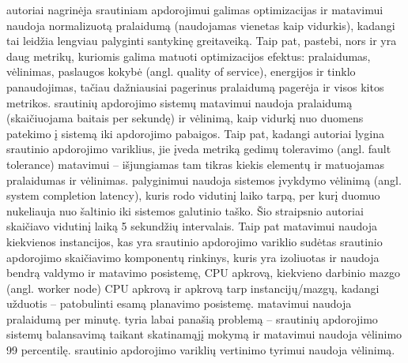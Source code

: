 \documentclass{VUMIFPSbakalaurinis}
\begin{document}
\cite{hirzel2014catalog} autoriai nagrinėja srautiniam apdorojimui galimas optimizacijas ir matavimui naudoja normalizuotą pralaidumą (naudojamas vienetas kaip vidurkis), kadangi tai leidžia lengviau palyginti santykinę greitaveiką. Taip pat, \cite{hirzel2014catalog} pastebi, nors ir yra daug metrikų, kuriomis galima matuoti optimizacijos efektus: pralaidumas, vėlinimas, paslaugos kokybė (angl. quality of service), energijos ir tinklo panaudojimas, tačiau dažniausiai pagerinus pralaidumą pagerėja ir visos kitos metrikos. \cite{Qian2016Benchmarking} srautinių apdorojimo sistemų matavimui naudoja pralaidumą (skaičiuojama baitais per sekundę) ir vėlinimą, kaip vidurkį nuo duomens patekimo į sistemą iki apdorojimo pabaigos. Taip pat, kadangi autoriai lygina srautinio apdorojimo variklius, jie įveda metriką gedimų toleravimo (angl. fault tolerance) matavimui – išjungiamas tam tikras kiekis elementų ir matuojamas pralaidumas ir vėlinimas. \cite{zhang2020heron} palyginimui naudoja sistemos įvykdymo vėlinimą (angl. system completion latency), kuris rodo vidutinį laiko tarpą, per kurį duomuo nukeliauja nuo šaltinio iki sistemos galutinio taško. Šio straipsnio autoriai skaičiavo vidutinį laiką 5 sekundžių intervalais. Taip pat \cite{zhang2020heron} matavimui naudoja kiekvienos instancijos, kas yra srautinio apdorojimo variklio sudėtas srautinio apdorojimo skaičiavimo komponentų rinkinys, kuris yra izoliuotas ir naudoja bendrą valdymo ir matavimo posistemę, CPU apkrovą, kiekvieno darbinio mazgo (angl. worker node) CPU apkrovą ir apkrovą tarp instancijų/mazgų, kadangi \cite{zhang2020heron} užduotis – patobulinti esamą planavimo posistemę. \cite{dhalion} matavimui naudoja pralaidumą per minutę. \cite{vaquero2018autotuning} tyria labai panašią problemą – srautinių apdorojimo sistemų balansavimą taikant skatinamąjį mokymą ir matavimui naudoja vėlinimo 99 percentilę. \cite{Chintapalli2016Benchmarking} srautinio apdorojimo variklių vertinimo tyrimui naudoja vėlinimą.
\end{document}
